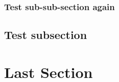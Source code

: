 \documentclass[a4paper,openany]{book}
\begin{document}
{\begin{multicols}{2}
\lipsum[10]

\subsubsection{Test sub-sub-section again}

\subsection{Test subsection}

\lipsum[2]

\elf


\lipsum[10]

\section{Last Section}

\lipsum[3]

\end{multicols}

}

\end{document}
